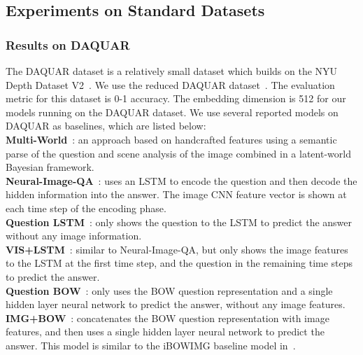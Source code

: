 \subsection{Experiments on Standard Datasets}\label{sec:expstandard}
\subsubsection{Results on DAQUAR}
The DAQUAR dataset is a relatively small dataset which builds on the NYU Depth Dataset V2~\cite{Silberman:ECCV12}. We use the reduced DAQUAR dataset~\cite{DBLP:journals/corr/MalinowskiF14}. The evaluation metric for this dataset is 0-1 accuracy. 
The embedding dimension is 512 for our models running on the DAQUAR dataset. 
We use several reported models on DAQUAR as baselines, which are listed below:\\
{} {\bf{Multi-World}}~\cite{DBLP:journals/corr/MalinowskiF14}: an approach based on handcrafted features using a semantic parse of the question and scene analysis of the image combined in a latent-world Bayesian framework.\\ 
{} {\bf{Neural-Image-QA}}~\cite{malinowski2015ask}: uses an LSTM to encode the question and then decode the hidden information into the answer. The image CNN feature vector is shown at each time step of the encoding phase.\\
{} {\bf{Question LSTM}}~\cite{malinowski2015ask}: only shows the question to the LSTM to predict the answer without any image information.\\
{} {\bf{VIS+LSTM}}~\cite{DBLP:journals/corr/RenKZ15}: similar to Neural-Image-QA, but only shows the image features to the LSTM at the first time step, and the question in the remaining time steps to predict the answer.\\
{} {\bf{Question BOW}}~\cite{DBLP:journals/corr/RenKZ15}: only uses the BOW question representation and a single hidden layer neural network to predict the answer, without any image features.\\
{} {\bf{IMG+BOW}}~\cite{DBLP:journals/corr/RenKZ15}: concatenates the BOW question representation with image features, and then uses a single hidden layer neural network to predict the answer. This model is similar to the iBOWIMG baseline model in~\cite{zhou2015simple}.

